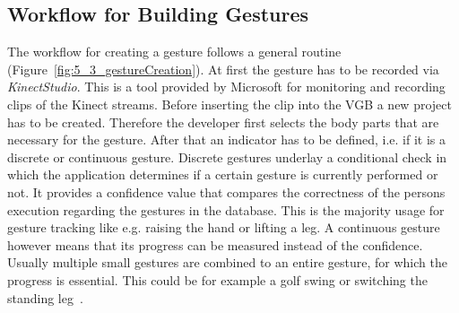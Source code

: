 \subsection{Workflow for Building Gestures}
The workflow for creating a gesture follows a general routine (Figure~\ref{fig:5_3_gestureCreation}). 
At first the gesture has to be recorded via \textit{KinectStudio}. This is a tool provided by Microsoft for monitoring and recording clips of the Kinect streams. Before inserting the clip into the VGB a new project has to be created. Therefore the developer first selects the body parts that are necessary for the gesture. After that an indicator has to be defined, i.e. if it is a discrete or continuous gesture. Discrete gestures underlay a conditional check in which the application determines if a certain gesture is currently performed or not. It provides a confidence value that compares the correctness of the persons execution regarding the gestures in the database. This is the majority usage for gesture tracking like e.g. raising the hand or lifting a leg. A continuous gesture however means that its progress can be measured instead of the confidence. Usually multiple small gestures are combined to an entire gesture, for which the progress is essential. This could be for example a golf swing or switching the standing leg~\cite{MicrosoftVGB}.

